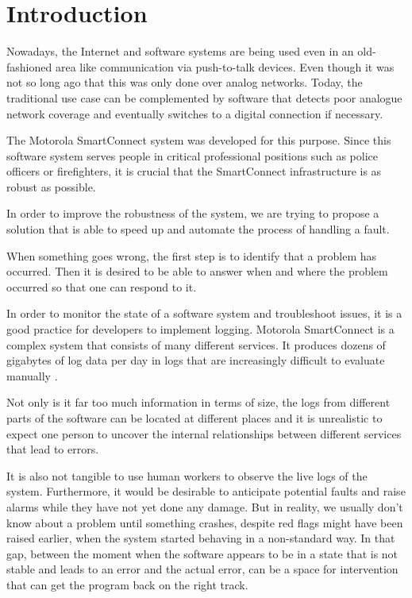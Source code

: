 \chapter{Introduction}
\label{introduction}

Nowadays, the Internet and software systems are being used even in an old-fashioned area like communication via push-to-talk devices. Even though it was not so long ago that this was only done over analog networks. Today, the traditional use case can be complemented by software that detects poor analogue network coverage and eventually switches to a digital connection if necessary. 

The Motorola SmartConnect \cite{apxnextfactsheet} system was developed for this purpose. 
Since this software system serves people in critical professional positions such as police officers or firefighters, it is crucial that the SmartConnect infrastructure is as robust as possible.

In order to improve the robustness of the system, we are trying to propose a solution that is able to speed up and automate the process of handling a fault.

When something goes wrong, the first step is to identify that a problem has occurred. 
Then it is desired to be able to answer when and where the problem occurred so that one can respond to it.

In order to monitor the state of a software system and troubleshoot issues, it is a good practice for developers to implement logging.
Motorola SmartConnect is a complex system that consists of many different services. It produces dozens of gigabytes of log data per day in logs that are increasingly difficult to evaluate manually \cite{anomalydetectiondistributedsystems}.

Not only is it far too much information in terms of size, the logs from different parts of the software can be located at different places and it is unrealistic to expect one person to uncover the internal relationships between different services that lead to errors.

It is also not tangible to use human workers to observe the live logs of the system. Furthermore, it would be desirable to anticipate potential faults and raise alarms while they have not yet done any damage. 
But in reality, we usually don't know about a problem until something crashes, despite red flags might have been raised earlier, when the system started behaving in a non-standard way. 
In that gap, between the moment when the software appears to be in a state that is not stable and leads to an error and the actual error, can be a space for intervention that can get the program back on the right track.

